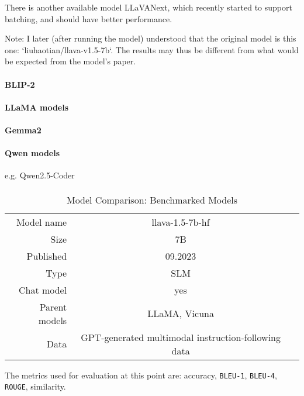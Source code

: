 \documentclass[10pt]{article}
\begin{document}
There is another available model LLaVANext, which recently started to support batching, and should have better performance. 


Note: I later (after running the model) understood that the original model is this one: `liuhaotian/llava-v1.5-7b`. The results may thus be different from what would be expected from the model's paper. 


\paragraph{BLIP-2}

\paragraph{LLaMA models}
 
\paragraph{Gemma2}

\paragraph{Qwen models} e.g.  Qwen2.5-Coder

\paragraph{}
 
\begin{table}
\centering
\begin{tabular}{rcc}
	\toprule
	Model name & llava-1.5-7b-hf & \\
	Size & 7B & \\
	Published & 09.2023 & \\
	Type & SLM & \\
	Chat model & yes & \\
	Parent models & LLaMA, Vicuna & \\
	Data & GPT-generated multimodal instruction-following data & \\
	\bottomrule
\end{tabular}
\caption{Model Comparison: Benchmarked Models}
\end{table}

The metrics used for evaluation at this point are: accuracy, \texttt{BLEU-1}, \texttt{BLEU-4}, \texttt{ROUGE}, similarity. 
\end{document}

